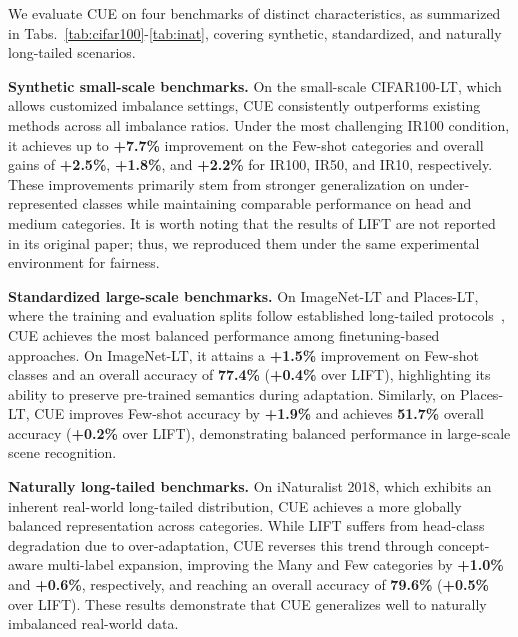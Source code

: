 We evaluate CUE on four benchmarks of distinct characteristics, as summarized in Tabs.~\ref{tab:cifar100}-\ref{tab:inat}, covering synthetic, standardized, and naturally long-tailed scenarios.


\noindent \textbf{Synthetic small-scale benchmarks.}
On the small-scale CIFAR100-LT, which allows customized imbalance settings, CUE consistently outperforms existing methods across all imbalance ratios. Under the most challenging IR100 condition, it achieves up to \textbf{+7.7\%} improvement on the Few-shot categories and overall gains of \textbf{+2.5\%}, \textbf{+1.8\%}, and \textbf{+2.2\%} for IR100, IR50, and IR10, respectively. These improvements primarily stem from stronger generalization on under-represented classes while maintaining comparable performance on head and medium categories. It is worth noting that the results of LIFT are not reported in its original paper; thus, we reproduced them under the same experimental environment for fairness.


\noindent \textbf{Standardized large-scale benchmarks.}
On ImageNet-LT and Places-LT, where the training and evaluation splits follow established long-tailed protocols~\cite{liu2019large}, CUE achieves the most balanced performance among finetuning-based approaches. On ImageNet-LT, it attains a \textbf{+1.5\%} improvement on Few-shot classes and an overall accuracy of \textbf{77.4\%} (\textbf{+0.4\%} over LIFT), highlighting its ability to preserve pre-trained semantics during adaptation. Similarly, on Places-LT, CUE improves Few-shot accuracy by \textbf{+1.9\%} and achieves \textbf{51.7\%} overall accuracy (\textbf{+0.2\%} over LIFT), demonstrating balanced performance in large-scale scene recognition.


\noindent \textbf{Naturally long-tailed benchmarks.}
On iNaturalist 2018, which exhibits an inherent real-world long-tailed distribution, CUE achieves a more globally balanced representation across categories.
While LIFT suffers from head-class degradation due to over-adaptation, CUE reverses this trend through concept-aware multi-label expansion, improving the Many and Few categories by \textbf{+1.0\%} and \textbf{+0.6\%}, respectively, and reaching an overall accuracy of \textbf{79.6\%} (\textbf{+0.5\%} over LIFT).
These results demonstrate that CUE generalizes well to naturally imbalanced real-world data.


